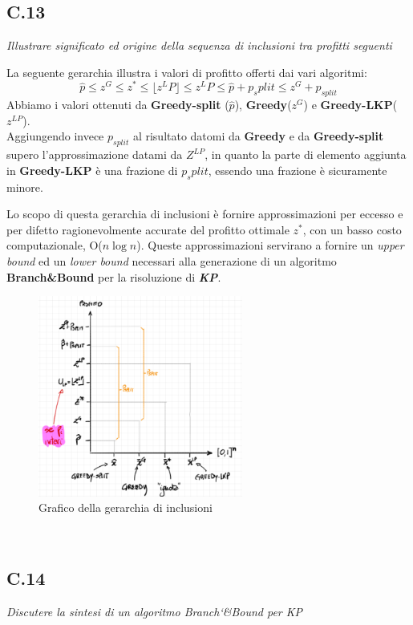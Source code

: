 \documentclass[a4paper]{article}
\newcommand{\imp}[1]{\textbf{\textit{#1}}}
\begin{document}
\subsection{C.13}
\label{SEC:C.13}
\emph{Illustrare significato ed origine della sequenza di inclusioni tra profitti seguenti}


La seguente gerarchia illustra i valori di profitto offerti dai vari algoritmi:
$$\hat p \leq z^G \leq z^* \leq \lfloor z^LP \rfloor  \leq z^LP \leq \hat p + p_split \leq z^G + p_{split}$$
Abbiamo i valori ottenuti da \textbf{Greedy-split} ($\hat p$), \textbf{Greedy}($z^G$) e \textbf{Greedy-LKP}($z^{LP}$).\\
Aggiungendo invece $p_{split}$ al risultato datomi da \textbf{Greedy} e da \textbf{Greedy-split} supero l'approssimazione datami da $Z^{LP}$, in quanto la parte di elemento aggiunta in \textbf{Greedy-LKP} è una frazione di $p_split$, essendo una frazione è sicuramente minore.

Lo scopo di questa gerarchia di inclusioni è fornire approssimazioni per eccesso e per difetto ragionevolmente accurate del profitto ottimale $z^*$, con un basso costo computazionale, O($n\log n$).
Queste approssimazioni servirano a fornire un \textit{upper bound} ed un \textit{lower bound} necessari alla generazione di un algoritmo \textbf{Branch\&Bound} per la risoluzione di \imp{KP}.\\
\begin{figure}[!ht]
\centering
\includegraphics[width=0.6\textwidth]{./img/C_13.png}
\caption{Grafico della gerarchia di inclusioni} \label{FIG:C_13}
\end{figure}\\
\subsection{C.14}
\emph{Discutere la sintesi di un algoritmo Branch\char`&Bound per KP}
\end{document}
